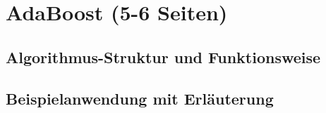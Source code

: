 \section{AdaBoost (5-6 Seiten)}
\subsection{Algorithmus-Struktur und Funktionsweise}
\subsection{Beispielanwendung mit Erläuterung}